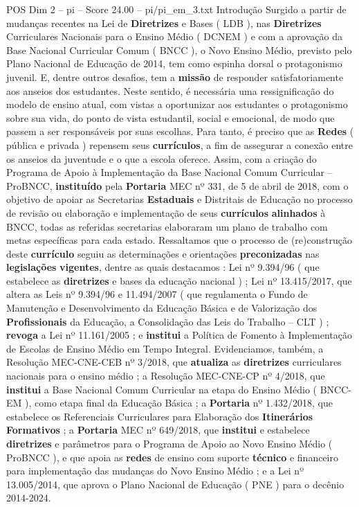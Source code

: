 \begin{textsample}{POS Dim 2 – pi – Score 24.00 – pi/pi\_em\_3.txt}  \label{ex:f2_pos_100}
Introdução Surgido a partir de mudanças recentes na Lei de \textbf{Diretrizes} e Bases ( LDB ), nas \textbf{Diretrizes} Curriculares Nacionais para o Ensino Médio ( DCNEM ) e com a aprovação da Base Nacional Curricular Comum ( BNCC ), o Novo Ensino Médio, previsto pelo Plano Nacional de Educação de 2014, tem como espinha dorsal o protagonismo juvenil.
E, dentre outros desafios, tem a \textbf{missão} de responder satisfatoriamente aos anseios dos estudantes.
Neste sentido, é necessária uma ressignificação do modelo de ensino atual, com vistas a oportunizar aos estudantes o protagonismo sobre sua vida, do ponto de vista estudantil, social e emocional, de modo que passem a ser responsáveis por suas escolhas.
Para tanto, é preciso que as \textbf{Redes} ( pública e privada ) repensem seus \textbf{currículos}, a fim de assegurar a conexão entre os anseios da juventude e o que a escola oferece.
Assim, com a criação do Programa de Apoio à Implementação da Base Nacional Comum Curricular – ProBNCC, \textbf{instituído} pela \textbf{Portaria} MEC nº 331, de 5 de abril de 2018, com o objetivo de apoiar as Secretarias \textbf{Estaduais} e Distritais de Educação no processo de revisão ou elaboração e implementação de seus \textbf{currículos} \textbf{alinhados} à BNCC, todas as referidas secretarias elaboraram um plano de trabalho com metas específicas para cada estado.
Ressaltamos que o processo de (re)construção deste \textbf{currículo} seguiu as determinações e orientações \textbf{preconizadas} nas \textbf{legislações} \textbf{vigentes}, dentre as quais destacamos : Lei nº 9.394/96 ( que estabelece as \textbf{diretrizes} e bases da educação nacional ) ; Lei nº 13.415/2017, que altera as Leis nº 9.394/96 e 11.494/2007 ( que regulamenta o Fundo de Manutenção e Desenvolvimento da Educação Básica e de Valorização dos \textbf{Profissionais} da Educação, a Consolidação das Leis do Trabalho – CLT ) ; \textbf{revoga} a Lei nº 11.161/2005 ; e \textbf{institui} a Política de Fomento à Implementação de Escolas de Ensino Médio em Tempo Integral.
Evidenciamos, também, a Resolução MEC-CNE-CEB nº 3/2018, que \textbf{atualiza} as \textbf{diretrizes} curriculares nacionais para o ensino médio ; a Resolução MEC-CNE-CP nº 4/2018, que \textbf{institui} a Base Nacional Comum Curricular na etapa do Ensino Médio ( BNCC-EM ), como etapa final da Educação Básica ; a \textbf{Portaria} nº 1.432/2018, que estabelece os Referenciais Curriculares para Elaboração dos \textbf{Itinerários} \textbf{Formativos} ; a \textbf{Portaria} MEC nº 649/2018, que \textbf{institui} e estabelece \textbf{diretrizes} e parâmetros para o Programa de Apoio ao Novo Ensino Médio ( ProBNCC ), e que apoia as \textbf{redes} de ensino com suporte \textbf{técnico} e financeiro para implementação das mudanças do Novo Ensino Médio ; e a Lei nº 13.005/2014, que aprova o Plano Nacional de Educação ( PNE ) para o decênio 2014-2024.

\end{textsample}
